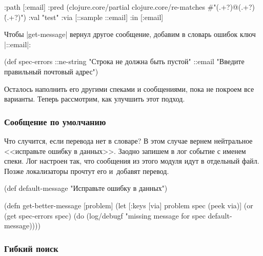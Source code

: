 \begin{english}
  \begin{clojure}
{:path [:email]
 :pred
 (clojure.core/partial
  clojure.core/re-matches
  #"(.+?)@(.+?)\.(.+?)")
 :val "test"
 :via [::sample ::email]
 :in [:email]}
  \end{clojure}
\end{english}

Чтобы \spverb|get-message| вернул другое сообщение, добавим в словарь ошибок
ключ \spverb|::email|:

  \begin{clojure}
(def spec-errors
  {::ne-string "Строка не должна быть пустой"
   ::email "Введите правильный почтовый адрес"})
  \end{clojure}

Осталось наполнить его другими спеками и сообщениями, пока не покроем все
варианты. Теперь рассмотрим, как улучшить этот подход.

\subsubsection{Сообщение по умолчанию}

Что случится, если перевода нет в словаре? В этом случае вернем нейтральное
<<исправьте ошибку в данных>>. Заодно запишем в лог событие с именем спеки. Лог
настроен так, что сообщения из этого модуля идут в отдельный файл. Позже
локализаторы прочтут его и~добавят перевод.

  \begin{clojure}
(def default-message
  "Исправьте ошибку в данных")
  \end{clojure}

\begin{english}
  \begin{clojure}
(defn get-better-message [problem]
  (let [{:keys [via]} problem
        spec (peek via)]
    (or (get spec-errors spec)
        (do (log/debugf "missing message for spec %
            default-message))))
  \end{clojure}
\end{english}

\subsubsection{Гибкий поиск}

